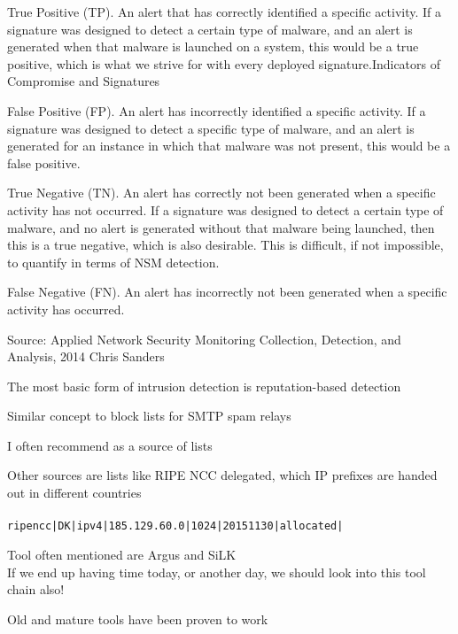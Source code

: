\documentclass[Screen16to9,17pt]{foils}
\begin{document}
\begin{list2}
\item True Positive (TP). An alert that has correctly identified a specific activity. If a signature was designed to detect a certain type of malware, and an alert is generated when that malware is launched on a system, this would be a true positive, which is what we strive for with every deployed signature.Indicators of Compromise and Signatures
\item False Positive (FP). An alert has incorrectly identified a specific activity. If a signature was designed to detect a specific type of malware, and an alert is generated for an instance in which that malware was not present, this would be a false positive.
\item True Negative (TN). An alert has correctly not been generated when a specific activity has not occurred. If a signature was designed to detect a certain type of malware, and no alert is generated without that malware being launched, then this is a true negative, which is also desirable. This is difficult, if not impossible, to quantify in terms of NSM detection.
\item False Negative (FN). An alert has incorrectly not been generated when a specific activity has occurred.
\end{list2}

Source: Applied Network Security Monitoring Collection, Detection, and Analysis, 2014 Chris Sanders



\begin{list2}
\item The most basic form of intrusion detection is reputation-based detection
\item Similar concept to block lists for SMTP spam relays
\item I often recommend  as a source of lists
\item Other sources are lists like RIPE NCC delegated, which IP prefixes are handed out in different countries\\
\\
\verb+ripencc|DK|ipv4|185.129.60.0|1024|20151130|allocated|+
\item Tool often mentioned are Argus and SiLK \\
If we end up having time today, or another day, we should look into this tool chain also!
\item Old and mature tools have been proven to work
\end{list2}
\end{document}
